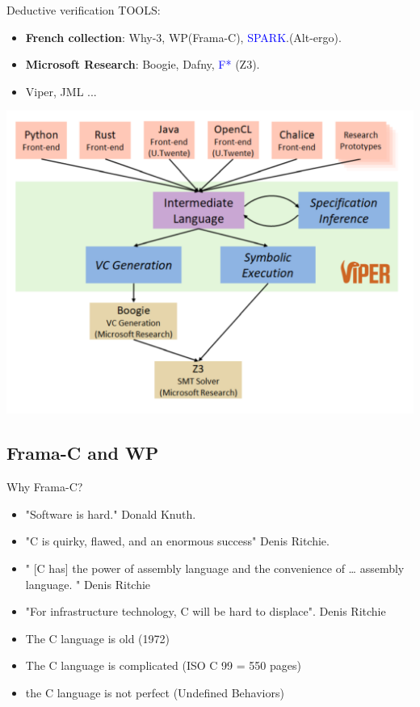 \begin{frame}{Deductive verification TOOLS:}
\begin{itemize}
	\item \textbf{French collection}: Why-3, WP(Frama-C), \textcolor{blue}{SPARK}.(Alt-ergo).
	\item \textbf{Microsoft Research}: Boogie, Dafny, \textcolor{blue}{F*} (Z3).
	\item Viper, JML ... 
\end{itemize}
\pause
\centering \includegraphics[scale=0.50]{content/images/static-analysis/viper.png}
\end{frame}

\subsection{Frama-C and WP}
\begin{frame}{Why Frama-C?}
\begin{itemize}	
\item "Software is hard." Donald Knuth.
\item "C is quirky, flawed, and an enormous success" Denis  Ritchie.
\item " [C has] the power of assembly language and the convenience of … assembly language. " Denis Ritchie 
\item "For infrastructure technology, C will be hard to displace". Denis  Ritchie
\item The C language is old (1972)
\item The C language is complicated (ISO C 99 = 550 pages)
\item the C language is not perfect (Undefined Behaviors)
\end{itemize}
\end{frame}


